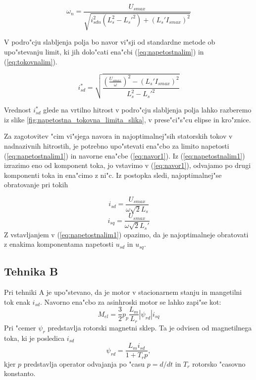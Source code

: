 \documentclass[journal,a4paper,twoside]{sty/IEEEtran}
\begin{document}
\begin{equation}
\omega_n=\frac{{U}_{smax}}{\sqrt{i_{sdn}^{2}(L_s^2-L_s'^2)+(L_s'I_{smax})^2}}
\label{nazivnaw}
\end{equation}



V podro"cju slabljenja polja bo navor vi"sji od standardne metode ob upo"stevanju limit, ki jih dolo"cati ena"cbi (\ref{eq:napetostnalim}) in (\ref{eq:tokovnalim}). 

\begin{equation}
\label{eq:zeljentok1}
i_{sd}^*=\sqrt{\frac{(\frac{U_{smax}}{\omega})^2-(L_s'I_{smax})^2}{L_s^2-L_s'^2}}
\end{equation}

Vrednost $i_{sd}^*$ glede na vrtilno hitrost v podro"cju slabljenja polja lahko razberemo iz slike \ref{fig:napetostna_tokovna_limita_slika}, v prese"ci"s"cu elipse in kro"znice. 

Za zagotovitev "cim vi"sjega navora in najoptimalnej"sih statorskih tokov v nadnazivnih hitrostih, je potrebno upo"stevati ena"cbo za limito napetosti (\ref{eq:napetostnalim1}) in navorne ena"cbe (\ref{eq:navor1}). Iz (\ref{eq:napetostnalim1}) izrazimo eno od komponent toka, jo vstavimo v (\ref{eq:navor1}), odvajamo po drugi komponenti toka in ena"cimo z ni"c. Iz postopka sledi, najoptimalnej"se obratovanje pri tokih

\begin{equation}
\label{eq:optimum_d}
i_{sd}=\frac{U_{smax}}{\omega \sqrt{2}L_s}
\end{equation} 
\begin{equation}
\label{eq:optimum_q}
i_{sq}=\frac{U_{smax}}{\omega \sqrt{2}L_s'}
\end{equation} 
Z vstavljanjem v (\ref{eq:napetostnalim1}) opazimo, da je najoptimalneje obratovati z enakima komponentama napetosti $u_{sd}$ in $u_{sq}$.\cite{vas}

\subsection{Tehnika B}
\label{sec:druga_metoda}

Pri tehniki A je upo"stevano, da je motor v stacionarnem stanju in mangetilni tok enak $i_{sd}$.
Navorno ena"cbo za asinhroski motor se lahko zapi"se kot:\cite{servopogoni}
\begin{equation}
\label{eq:navor2}
M_{el}=\frac{3}{2}p_p \frac{L_m}{L_r}|\psi_{rd}|i_{sq}
\end{equation}
Pri "cemer $\psi_{r}$ predstavlja rotorski magnetni sklep. Ta je odvisen od magnetilnega toka, ki je posledica $i_{sd}$
\begin{equation}
\label{eq:flux}
\psi_{rd}= \frac{L_m i_{sd}}{1+T_r p},
\end{equation}
kjer $p$ predstavlja operator odvajanja po "casu $p=d/dt$ in $T_r$ rotorsko "casovno konstanto.
\end{document}
